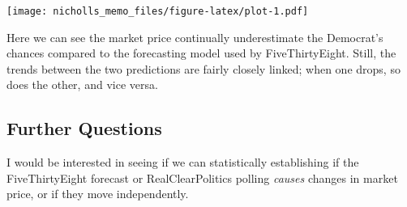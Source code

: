 \documentclass[]{article}
\newenvironment{Shaded}{\begin{snugshade}}{\end{snugshade}}
\newcommand{\KeywordTok}[1]{\textcolor[rgb]{0.13,0.29,0.53}{\textbf{#1}}}
\newcommand{\DataTypeTok}[1]{\textcolor[rgb]{0.13,0.29,0.53}{#1}}
\newcommand{\DecValTok}[1]{\textcolor[rgb]{0.00,0.00,0.81}{#1}}
\newcommand{\StringTok}[1]{\textcolor[rgb]{0.31,0.60,0.02}{#1}}
\newcommand{\OperatorTok}[1]{\textcolor[rgb]{0.81,0.36,0.00}{\textbf{#1}}}
\newcommand{\NormalTok}[1]{#1}
\begin{document}
\begin{Shaded}
\end{Shaded}

\texttt{[image: nicholls\_memo\_files/figure-latex/plot-1.pdf]}

Here we can see the market price continually underestimate the
Democrat's chances compared to the forecasting model used by
FiveThirtyEight. Still, the trends between the two predictions are
fairly closely linked; when one drops, so does the other, and vice
versa.

\subsection{Further Questions}\label{further-questions}

I would be interested in seeing if we can statistically establishing if
the FiveThirtyEight forecast or RealClearPolitics polling \emph{causes}
changes in market price, or if they move independently.
\end{document}
